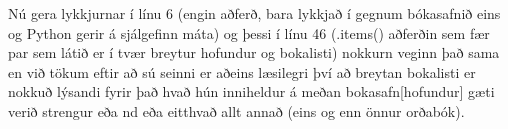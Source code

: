 Nú gera lykkjurnar í línu 6 (engin aðferð, bara lykkjað í gegnum bókasafnið eins og Python gerir á sjálgefinn máta) og þessi í línu 46 (.items() aðferðin sem fær par sem látið er í tvær breytur hofundur og bokalisti) nokkurn veginn það sama en við tökum eftir að sú seinni er aðeins læsilegri því að breytan bokalisti er nokkuð lýsandi fyrir það hvað hún inniheldur á meðan bokasafn[hofundur] gæti verið strengur eða nd eða eitthvað allt annað (eins og enn önnur orðabók).